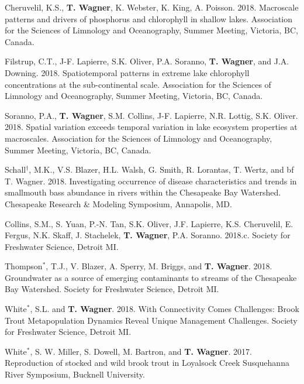 \documentclass[10pt]{article}
\begin{document}
\begin{flushleft}
\begin{etaremune}
\item Cheruvelil, K.S., {\bf T. Wagner}, K. Webster, K. King, A. Poisson. 2018. Macroscale patterns and drivers of phosphorus and chlorophyll in shallow lakes. Association for the Sciences of Limnology and Oceanography, Summer Meeting, Victoria, BC, Canada.

\item Filstrup, C.T., J-F. Lapierre, S.K. Oliver, P.A. Soranno, {\bf T. Wagner}, and J.A. Downing. 2018. Spatiotemporal patterns in extreme lake chlorophyll concentrations at the sub-continental scale. Association for the Sciences of Limnology and Oceanography, Summer Meeting, Victoria, BC, Canada.

\item Soranno, P.A., {\bf T. Wagner}, S.M. Collins, J-F. Lapierre, N.R. Lottig, S.K. Oliver. 2018. Spatial variation exceeds temporal variation in lake ecosystem properties at macroscales. Association for the Sciences of Limnology and Oceanography, Summer Meeting, Victoria, BC, Canada.

\item Schall$^\dagger$, M.K., V.S. Blazer, H.L. Walsh, G. Smith, R. Lorantas, T. Wertz, and {bf T. Wagner}. 2018. Investigating occurrence of disease characteristics and trends in smallmouth bass abundance in rivers within the Chesapeake Bay Watershed. Chesapeake Research \& Modeling Symposium, Annapolis, MD.

\item Collins, S.M., S. Yuan, P.-N. Tan, S.K. Oliver, J.F. Lapierre, K.S. Cheruvelil, E. Fergus, N.K. Skaff, J. Stachelek, {\bf T. Wagner}, P.A. Soranno. 2018.c. Society for Freshwater Science, Detroit MI.

\item Thompson$^*$, T.J., V. Blazer, A. Sperry, M. Briggs, and {\bf T. Wagner}. 2018. Groundwater as a source of emerging contaminants to streams of the Chesapeake Bay Watershed. Society for Freshwater Science, Detroit MI.

\item White$^*$, S.L. and {\bf T. Wagner}. 2018. With Connectivity Comes Challenges: Brook Trout Metapopulation Dynamics Reveal Unique Management Challenges. Society for Freshwater Science, Detroit MI.

\item White$^*$, S. W. Miller, S. Dowell, M. Bartron, and {\bf T. Wagner}. 2017. Reproduction of stocked and wild brook trout in Loyalsock Creek  Susquehanna River Symposium, Bucknell University.


\end{etaremune}
\end{flushleft}
\end{document}
